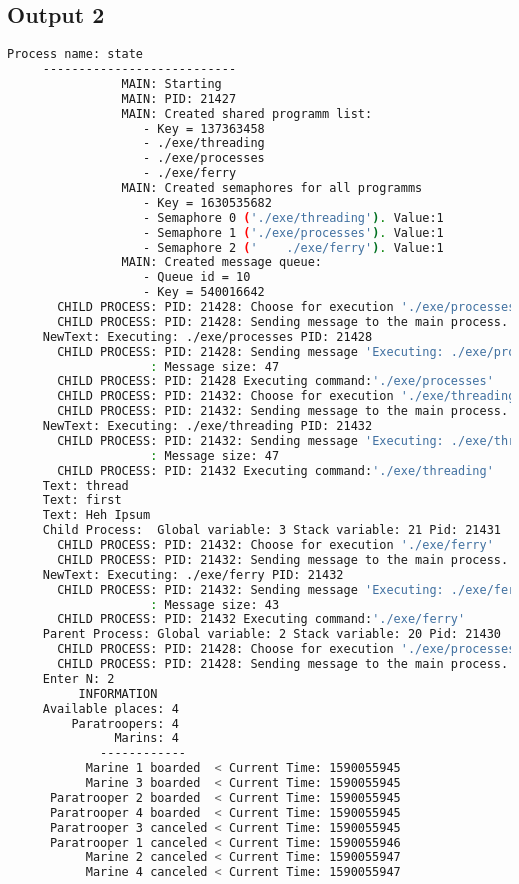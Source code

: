 \documentclass{article}
\begin{document}
\subsection{Output 2}
\begin{lstlisting}[language=BASH]
     Process name: state
     ---------------------------
                MAIN: Starting
                MAIN: PID: 21427
                MAIN: Created shared programm list:
                   - Key = 137363458
                   - ./exe/threading
                   - ./exe/processes
                   - ./exe/ferry
                MAIN: Created semaphores for all programms
                   - Key = 1630535682
                   - Semaphore 0 ('./exe/threading'). Value:1
                   - Semaphore 1 ('./exe/processes'). Value:1
                   - Semaphore 2 ('    ./exe/ferry'). Value:1
                MAIN: Created message queue:
                   - Queue id = 10
                   - Key = 540016642
       CHILD PROCESS: PID: 21428: Choose for execution './exe/processes'
       CHILD PROCESS: PID: 21428: Sending message to the main process...
     NewText: Executing: ./exe/processes PID: 21428
       CHILD PROCESS: PID: 21428: Sending message 'Executing: ./exe/processes PID: 21428' to the MAIN process...
                    : Message size: 47
       CHILD PROCESS: PID: 21428 Executing command:'./exe/processes'
       CHILD PROCESS: PID: 21432: Choose for execution './exe/threading'
       CHILD PROCESS: PID: 21432: Sending message to the main process...
     NewText: Executing: ./exe/threading PID: 21432
       CHILD PROCESS: PID: 21432: Sending message 'Executing: ./exe/threading PID: 21432' to the MAIN process...
                    : Message size: 47
       CHILD PROCESS: PID: 21432 Executing command:'./exe/threading'
     Text: thread
     Text: first
     Text: Heh Ipsum
     Child Process:  Global variable: 3 Stack variable: 21 Pid: 21431
       CHILD PROCESS: PID: 21432: Choose for execution './exe/ferry'
       CHILD PROCESS: PID: 21432: Sending message to the main process...
     NewText: Executing: ./exe/ferry PID: 21432
       CHILD PROCESS: PID: 21432: Sending message 'Executing: ./exe/ferry PID: 21432' to the MAIN process...
                    : Message size: 43
       CHILD PROCESS: PID: 21432 Executing command:'./exe/ferry'
     Parent Process: Global variable: 2 Stack variable: 20 Pid: 21430
       CHILD PROCESS: PID: 21428: Choose for execution './exe/processes'
       CHILD PROCESS: PID: 21428: Sending message to the main process...
     Enter N: 2
          INFORMATION
     Available places: 4
         Paratroopers: 4
               Marins: 4
             ------------
           Marine 1 boarded  < Current Time: 1590055945 
           Marine 3 boarded  < Current Time: 1590055945 
      Paratrooper 2 boarded  < Current Time: 1590055945 
      Paratrooper 4 boarded  < Current Time: 1590055945 
      Paratrooper 3 canceled < Current Time: 1590055945 
      Paratrooper 1 canceled < Current Time: 1590055946 
           Marine 2 canceled < Current Time: 1590055947 
           Marine 4 canceled < Current Time: 1590055947 
     

\end{lstlisting}
\end{document}
